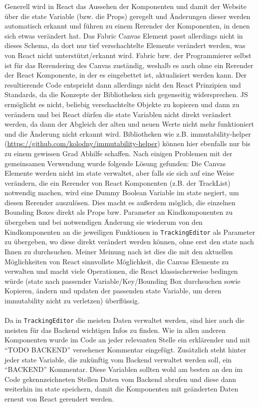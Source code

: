 Generell wird in React das Aussehen der Komponenten und damit der Website über die state Variable (bzw. die Props) geregelt und Änderungen dieser werden automatisch erkannt und führen zu einem Rerender der Komponenten, in denen sich etwas verändert hat. Das Fabric Canvas Element passt allerdings nicht in dieses Schema, da dort nur tief verschachtelte Elemente verändert werden, was von React nicht unterstützt/erkannt wird. Fabric bzw. der Programmierer selbst ist für das Rerendering des Canvas zuständig, weshalb es auch ohne ein Rerender der React Komponente, in der es eingebettet ist, aktualisiert werden kann. Der resultierende Code entspricht dann allerdings nicht den React Prinzipien und Standards, da die Konzepte der Bibliotheken sich gegenseitig widersprechen. JS ermöglicht es nicht, beliebig verschachtelte Objekte zu kopieren und dann zu verändern und bei React dürfen die state Variablen nicht direkt verändert werden, da dann der Abgleich der alten und neuen Werte nicht mehr funktioniert und die Änderung nicht erkannt wird. Bibliotheken wie z.B. immutability-helper (\url{https://github.com/kolodny/immutability-helper}) \cite{immutability-helper} können hier ebenfalls nur bis zu einem gewissen Grad Abhilfe schaffen. Nach einigen Problemen mit der gemeinsamen Verwendung wurde folgende Lösung gefunden: Die Canvas Elemente werden nicht im state verwaltet, aber falls sie sich auf eine Weise verändern, die ein Rerender von React Komponenten (z.B. der TrackList) notwendig machen, wird eine Dummy Boolean Variable im state negiert, um diesen Rerender auszulösen. Dies macht es außerdem möglich, die einzelnen Bounding Boxes direkt als Props bzw. Parameter an Kindkomponenten zu übergeben und bei notwendigen Änderung sie wiederum von den Kindkomponenten an die jeweiligen Funktionen in \texttt{TrackingEditor} als Parameter zu übergeben, wo diese direkt verändert werden können, ohne erst den state nach Ihnen zu durchsuchen. Meiner Meinung nach ist dies die mit den aktuellen Möglichkeiten von React sinnvollste Möglichkeit, die Canvas Elemente zu verwalten und macht viele Operationen, die React klassischerweise bedingen würde (state nach passender Variable/Key/Bounding Box durchsuchen sowie Kopieren, ändern und updaten der passenden state Variable, um deren immutability nicht zu verletzen) überflüssig. \\
\\
Da in \texttt{TrackingEditor} die meisten Daten verwaltet werden, sind hier auch die meisten für das Backend wichtigen Infos zu finden. Wie in allen anderen Komponenten wurde im Code an jeder relevanten Stelle ein erklärender und mit ``TODO BACKEND'' versehener Kommentar eingefügt. Zusätzlich steht hinter jeder state Variable, die zukünftig vom Backend verwaltet werden soll, ein ``BACKEND'' Kommentar. Diese Variablen sollten wohl am besten an den im Code gekennzeichneten Stellen Daten vom Backend abrufen und diese dann weiterhin im state speichern, damit die Komponenten mit geänderten Daten erneut von React gerendert werden. \\


